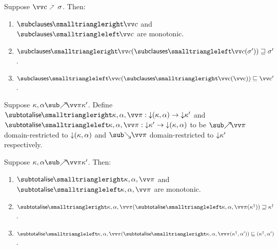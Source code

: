 \begin{lemma}
  \label{lem:aux:clauses:gc}
  Suppose $\vec{c} \clauseFwd \sigma$. Then:
  \begin{enumerate}
     \item $\desugarClausesFwdF{\vec{c}}$ and $\desugarClausesBwdF{\vec{c}}$ are monotonic.
     \item $\desugarClausesFwdF{\vec{c}}(\desugarClausesBwdF{\vec{c}}(\sigma')) \geq \sigma'$.
     \item $\desugarClausesBwdF{\vec{c}}(\desugarClausesFwdF{\vec{c}}(\vec{c})) \leq \vec{c}'$.
  \end{enumerate}
\end{lemma}

\begin{definition}
   Suppose $\totaliseFwd{\kappa}{\alpha}{\vec{\pi}}{\kappa'}$. Define $\totaliseFwdF{\kappa,\alpha,\vec{\pi}}: \Below{(\kappa,\alpha)} \to \Below{\kappa'}$ and $\totaliseBwdF{\kappa,\alpha,\vec{\pi}}: \Below{\kappa'} \to \Below{(\kappa,\alpha)}$ to be $\totaliseFwdR{\vec{\pi}}$ domain-restricted to ${\downarrow}{(\kappa,\alpha)}$ and $\totaliseBwdR{\vec{\pi}}$ domain-restricted to ${\downarrow}{\kappa'}$ respectively.
\end{definition}

\begin{lemma}
  \label{lem:aux:list-gen:gc}
  \item
  Suppose $\totaliseFwd{\kappa}{\alpha}{\vec{\pi}}{\kappa'}$. Then:
  \begin{enumerate}
     \item $\totaliseFwdF{\kappa,\alpha,\vec{\pi}}$ and $\totaliseBwdF{\kappa,\alpha,\vec{\pi}}$ are monotonic.
     \item $\totaliseFwdF{\kappa,\alpha,\vec{\pi}}(\totaliseBwdF{\kappa,\alpha,\vec{\pi}}(\smash{\kappa^\dagger})) \geq \smash{\kappa^\dagger}$.
     \item $\totaliseBwdF{\kappa,\alpha,\vec{\pi}}(\totaliseFwdF{\kappa,\alpha,\vec{\pi}}(\smash{\kappa^\dagger}, \alpha')) \leq (\smash{\kappa^\dagger}, \alpha')$.
  \end{enumerate}
\end{lemma}
